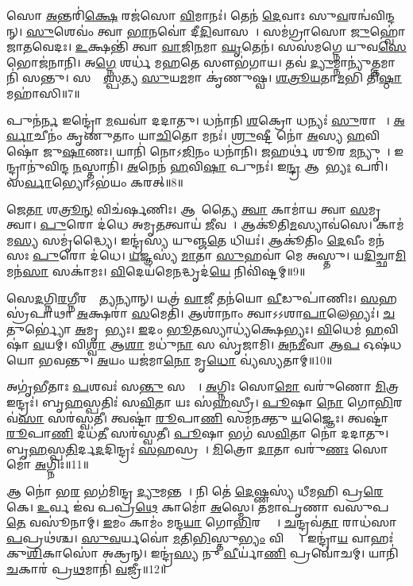 𑌸𑍋 \ul{𑌅}𑌨𑍍𑌤𑌰𑌿॑\ul{𑌕𑍍𑌷𑍇} 𑌰𑌜॑𑌸𑍋 \ul{𑌵𑌿}𑌮𑌾𑌨𑌃॑।
𑌤𑍇𑌨॑ \ul{𑌦𑍇}𑌵𑌾𑌃 𑌸𑍁\ul{𑌵}𑌰𑌨𑍍𑌵॑𑌵𑌿𑌨𑍍𑌦𑌨𑍍।
\ul{𑌸𑍁}𑌶𑍇𑌵𑌂॑ 𑌤𑍍𑌵𑌾 \ul{𑌭𑌾}𑌨𑌵𑍋॑ 𑌦𑍀\ul{𑌦𑌿}𑌵𑌾𑌸𑌮𑍍᳚।
𑌸𑌮॑𑌗𑍍𑌰𑌾𑌸𑍋 \ul{𑌜𑍁}𑌹𑍍𑌵𑍋॑ 𑌜𑌾𑌤𑌵𑍇𑌦𑌃।
\ul{𑌉}𑌕𑍍𑌷𑌨𑍍𑌤𑌿॑ 𑌤𑍍𑌵𑌾 \ul{𑌵𑌾}𑌜𑌿\ul{𑌨}𑌮𑌾 \ul{𑌘𑍃}𑌤𑍇𑌨॑।
𑌸𑌸॑𑌮𑌗𑍍𑌨𑍇 𑌯𑍁𑌵\ul{𑌸𑍇} 𑌭𑍋𑌜॑𑌨𑌾𑌨𑌿।
𑌅\ul{𑌗𑍍𑌨𑍇} 𑌶𑌰𑍍𑌧॑ 𑌮\ul{𑌹}𑌤𑍇 𑌸𑍗𑌭॑𑌗𑌾𑌯।
𑌤𑌵॑ \ul{𑌦𑍍𑌯𑍁}𑌮𑍍𑌨𑌾𑌨𑍍𑌯𑍁॑\ul{𑌤𑍍𑌤}𑌮𑌾𑌨𑌿॑ 𑌸𑌨𑍍𑌤𑍁।
𑌸𑌞𑍍𑌜𑌾᳚\ul{𑌸𑍍𑌪}𑌤𑍍𑌯 \ul{𑌸𑍁}𑌯\ul{𑌮}𑌮𑌾 𑌕𑍃॑𑌣𑍁𑌷𑍍𑌵।
\ul{𑌶}\ul{𑌤𑍍𑌰𑍂}\ul{𑌯}𑌤𑌾\ul{𑌮}𑌭𑌿 𑌤𑌿॑\ul{𑌷𑍍𑌠𑌾} 𑌮𑌹𑌾॑𑌸𑌿॥7॥\anuvakamend[\ul{𑌅}\ul{𑌸𑍍𑌤𑍍𑌵𑍇}\ul{𑌤𑍁} 𑌰𑍋𑌹𑌿॑\ul{𑌤𑍋} 𑌨𑌾\ul{𑌕𑍋} 𑌮𑌹𑌾\dng{ꣳ}॑𑌸𑌿]

𑌪𑍁𑌨॑\ul{𑌰𑍍𑌨} 𑌇𑌨𑍍𑌦𑍍𑌰𑍋॑ \ul{𑌮}𑌘𑌵𑌾॑ 𑌦𑌦𑌾𑌤𑍁।
𑌧𑌨𑌾॑𑌨𑌿 \ul{𑌶}𑌕𑍍𑌰𑍋 𑌧𑌨𑍍𑌯𑌃॑ \ul{𑌸𑍁}𑌰𑌾𑌧𑌾𑌃᳚।
\ul{𑌅}\ul{𑌰𑍍𑌵𑌾}𑌚𑍀𑌨𑌂॑ 𑌕𑍃𑌣𑍁𑌤𑌾𑌂 𑌯𑌾\ul{𑌚𑌿}𑌤𑍋 𑌮𑌨𑌃॑।
\ul{𑌶𑍍𑌰𑍁}𑌷𑍍𑌟𑍀 𑌨𑍋॑ \ul{𑌅}𑌸𑍍𑌯 \ul{𑌹}𑌵𑌿𑌷𑍋॑ 𑌜𑍁\ul{𑌷𑌾}𑌣𑌃।
𑌯𑌾𑌨𑌿॑ 𑌨𑍋𑌽\ul{𑌜𑌿}𑌨𑌂 𑌧𑌨𑌾॑𑌨𑌿।
\ul{𑌜}𑌹𑌰𑍍𑌥॑ 𑌶𑍂𑌰 \ul{𑌮}𑌨𑍍𑌯𑍁𑌨𑌾᳚।
𑌇𑌨𑍍𑌦𑍍𑌰𑌾𑌨𑍁॑𑌵𑌿𑌨𑍍𑌦 \ul{𑌨}𑌸𑍍𑌤𑌾𑌨𑌿॑।
\ul{𑌅}𑌨𑍇𑌨॑ \ul{𑌹}𑌵𑌿\ul{𑌷𑌾} 𑌪𑍁𑌨𑌃॑।
𑌇\ul{𑌨𑍍𑌦𑍍𑌰} 𑌆𑌶𑌾᳚\ul{𑌭𑍍𑌯𑌃} 𑌪𑌰𑌿॑।
𑌸\ul{𑌰𑍍𑌵𑌾}𑌭𑍍𑌯𑍋\-𑌽𑌭॑𑌯𑌂 𑌕𑌰𑌤𑍍॥8॥

𑌜𑍇\ul{𑌤𑌾} 𑌶\ul{𑌤𑍍𑌰𑍂}\ul{𑌨𑍍} 𑌵𑌿𑌚॑𑌰𑍍\mbox{}𑌷𑌣𑌿𑌃।
𑌆𑌕𑍂᳚𑌤𑍍𑌯𑍈 \ul{𑌤𑍍𑌵𑌾} 𑌕𑌾𑌮𑌾॑𑌯 𑌤𑍍𑌵𑌾 \ul{𑌸}𑌮𑍃𑌧𑍇᳚ 𑌤𑍍𑌵𑌾।
\ul{𑌪𑍁}𑌰𑍋 𑌦॑𑌧𑍇 𑌅𑌮𑍃\ul{𑌤}𑌤𑍍𑌵𑌾𑌯॑ \ul{𑌜𑍀}𑌵𑌸𑍇᳚।
𑌆𑌕𑍂॑𑌤𑌿\ul{𑌮}𑌸𑍍𑌯𑌾𑌵॑𑌸𑍇।
𑌕𑌾𑌮॑𑌮\ul{𑌸𑍍𑌯} 𑌸𑌮𑍃॑𑌦𑍍𑌧𑍍𑌯𑍈।
𑌇𑌨𑍍𑌦𑍍𑌰॑𑌸𑍍𑌯 𑌯𑍁𑌞𑍍𑌜\ul{𑌤𑍇} 𑌧𑌿𑌯𑌃॑।
𑌆𑌕𑍂॑𑌤𑌿𑌂 \ul{𑌦𑍇}𑌵𑍀𑌂 𑌮𑌨॑𑌸𑌃 \ul{𑌪𑍁}𑌰𑍋 𑌦॑𑌧𑍇।
\ul{𑌯}𑌜𑍍𑌞𑌸𑍍𑌯॑ \ul{𑌮𑌾}𑌤𑌾 \ul{𑌸𑍁}𑌹𑌵𑌾॑ 𑌮𑍇 𑌅𑌸𑍍𑌤𑍁।
𑌯\ul{𑌦𑌿}𑌚𑍍𑌛𑌾\ul{𑌮𑌿} 𑌮𑌨॑\ul{𑌸𑌾} 𑌸𑌕𑌾॑𑌮𑌃।
\ul{𑌵𑌿}𑌦𑍇𑌯॑𑌮𑍇\ul{𑌨}𑌦𑍍𑌧𑍃𑌦॑\ul{𑌯𑍇} 𑌨𑌿𑌵𑌿॑𑌷𑍍𑌟𑌮𑍍॥9॥

𑌸𑍇\ul{𑌦}𑌗𑍍𑌨𑌿\ul{𑌰}𑌗𑍍𑌨𑍀𑌰𑌤𑍍𑌯𑍇᳚\ul{𑌤𑍍𑌯}𑌨𑍍𑌯𑌾𑌨𑍍।
𑌯𑌤𑍍𑌰॑ \ul{𑌵𑌾}𑌜𑍀 𑌤𑌨॑𑌯𑍋 \ul{𑌵𑍀}𑌡𑍁𑌪𑌾॑𑌣𑌿𑌃।
\ul{𑌸}𑌹𑌸𑍍𑌰॑𑌪𑌾𑌥𑌾 \ul{𑌅}𑌕𑍍𑌷𑌰𑌾॑ \ul{𑌸}𑌮𑍇𑌤𑌿॑।
𑌆𑌶𑌾॑𑌨𑌾𑌂 𑌤𑍍𑌵𑌾\-𑌽𑌽𑌶𑌾\ul{𑌪𑌾}𑌲𑍇𑌭𑍍𑌯𑌃॑।
\ul{𑌚}𑌤𑍁𑌰𑍍𑌭𑍍𑌯𑍋॑ \ul{𑌅}𑌮𑍃𑌤𑍇᳚𑌭𑍍𑌯𑌃।
\ul{𑌇}𑌦𑌂 \ul{𑌭𑍂}𑌤𑌸𑍍𑌯𑌾𑌧𑍍𑌯॑𑌕𑍍𑌷𑍇𑌭𑍍𑌯𑌃।
\ul{𑌵𑌿}𑌧𑍇𑌮॑ \ul{𑌹}𑌵𑌿𑌷𑌾॑ \ul{𑌵}𑌯𑌮𑍍।
𑌵𑌿\ul{𑌶𑍍𑌵𑌾} 𑌆\ul{𑌶𑌾} 𑌮𑌧𑍁॑\ul{𑌨𑌾} 𑌸 𑌸𑍃॑𑌜𑌾𑌮𑌿।
\ul{𑌅}\ul{𑌨}\ul{𑌮𑍀}𑌵𑌾 𑌆\ul{𑌪} 𑌓𑌷॑𑌧𑌯𑍋 𑌭𑌵𑌨𑍍𑌤𑍁।
\ul{𑌅}𑌯𑌂 𑌯𑌜॑𑌮𑌾\ul{𑌨𑍋} 𑌮𑍃\ul{𑌧𑍋} 𑌵𑍍𑌯॑𑌸𑍍𑌯𑌤𑌾𑌮𑍍॥10॥

𑌅𑌗𑍃॑𑌭𑍀𑌤𑌾𑌃 \ul{𑌪}𑌶𑌵𑌃॑ 𑌸\ul{𑌨𑍍𑌤𑍁} 𑌸𑌰𑍍𑌵𑍇᳚।
\ul{𑌅}𑌗𑍍𑌨𑌿𑌃 𑌸𑍋\ul{𑌮𑍋} 𑌵𑌰𑍁॑𑌣𑍋 \ul{𑌮𑌿}𑌤𑍍𑌰 𑌇𑌨𑍍𑌦𑍍𑌰𑌃॑।
𑌬𑍃\ul{𑌹}𑌸𑍍𑌪𑌤𑌿𑌃॑ 𑌸\ul{𑌵𑌿}𑌤𑌾 𑌯𑌃 𑌸॑\ul{𑌹}𑌸𑍍𑌰𑍀।
\ul{𑌪𑍂}𑌷𑌾 \ul{𑌨𑍋} 𑌗𑍋\ul{𑌭𑌿}𑌰𑌵॑\ul{𑌸𑌾} 𑌸𑌰॑𑌸𑍍𑌵𑌤𑍀।
𑌤𑍍𑌵𑌷𑍍𑌟𑌾॑ \ul{𑌰𑍂}𑌪𑌾\ul{𑌣𑌿} 𑌸𑌮॑𑌨𑌕𑍍𑌤𑍁 \ul{𑌯}𑌜𑍍𑌞𑍈𑌃।
𑌤𑍍𑌵𑌷𑍍𑌟𑌾॑ \ul{𑌰𑍂}𑌪𑌾\ul{𑌣𑌿} 𑌦𑌧॑\ul{𑌤𑍀} 𑌸𑌰॑𑌸𑍍𑌵𑌤𑍀।
\ul{𑌪𑍂}𑌷𑌾 𑌭𑌗॑ 𑌸\ul{𑌵𑌿}𑌤𑌾 𑌨𑍋॑ 𑌦𑌦𑌾𑌤𑍁।
𑌬𑍃\ul{𑌹}𑌸𑍍𑌪\ul{𑌤𑌿}𑌰𑍍𑌦\ul{𑌦}𑌦𑌿𑌨𑍍𑌦𑍍𑌰𑌃॑ \ul{𑌸}𑌹𑌸𑍍𑌰𑌮𑍍᳚।
\ul{𑌮𑌿}𑌤𑍍𑌰𑍋 \ul{𑌦𑌾}𑌤𑌾 𑌵𑌰𑍁॑\ul{𑌣𑌃} 𑌸𑍋𑌮𑍋॑ \ul{𑌅}𑌗𑍍𑌨𑌿𑌃॥11॥\anuvakamend[\ul{𑌕}\ul{𑌰}𑌨𑍍𑌨𑌿𑌵𑌿॑𑌷𑍍𑌟𑌮𑌸𑍍𑌯\ul{𑌤𑌾}𑌨𑍍𑌨𑌵॑ 𑌚]

𑌆 𑌨𑍋॑ 𑌭\ul{𑌰} 𑌭𑌗॑𑌮𑌿𑌨𑍍𑌦𑍍𑌰 \ul{𑌦𑍍𑌯𑍁}𑌮𑌨𑍍𑌤𑌮𑍍᳚।
𑌨𑌿 𑌤𑍇॑ \ul{𑌦𑍇}𑌷𑍍𑌣𑌸𑍍𑌯॑ 𑌧𑍀𑌮𑌹𑌿 𑌪𑍍𑌰\ul{𑌰𑍇}𑌕𑍇।
\ul{𑌉}𑌰𑍍𑌵 𑌇॑𑌵 𑌪𑌪𑍍𑌰\ul{𑌥𑍇} 𑌕𑌾𑌮𑍋॑ \ul{𑌅}𑌸𑍍𑌮𑍇।
𑌤𑌮𑌾𑌪𑍃॑𑌣𑌾 𑌵𑌸𑍁𑌪\ul{𑌤𑍇} 𑌵𑌸𑍂॑𑌨𑌾𑌮𑍍।
\ul{𑌇}𑌮𑌂 𑌕𑌾𑌮𑌂॑ 𑌮𑌨𑍍𑌦\ul{𑌯𑌾} 𑌗𑍋\ul{𑌭𑌿}𑌰𑌶𑍍𑌵𑍈𑌃᳚।
\ul{𑌚}𑌨𑍍𑌦𑍍𑌰𑌵॑\ul{𑌤𑌾} 𑌰𑌾𑌧॑𑌸𑌾 \ul{𑌪}𑌪𑍍𑌰𑌥॑𑌶𑍍𑌚।
\ul{𑌸𑍁}\ul{𑌵}𑌰𑍍𑌯𑌵𑍋॑ \ul{𑌮}𑌤𑌿\ul{𑌭𑌿}𑌸𑍍𑌤𑍁\ul{𑌭𑍍𑌯𑌂} 𑌵𑌿𑌪𑍍𑌰𑌾𑌃᳚।
𑌇𑌨𑍍𑌦𑍍𑌰𑌾॑\ul{𑌯} 𑌵𑌾𑌹𑌃॑ 𑌕𑍁\ul{𑌶𑌿}𑌕𑌾𑌸𑍋॑ 𑌅𑌕𑍍𑌰𑌨𑍍।
𑌇𑌨𑍍𑌦𑍍𑌰॑\ul{𑌸𑍍𑌯} 𑌨𑍁 \ul{𑌵𑍀}𑌰𑍍𑌯𑌾॑\ul{𑌣𑌿} 𑌪𑍍𑌰𑌵𑍋॑𑌚𑌮𑍍।
𑌯𑌾𑌨𑌿॑ \ul{𑌚}𑌕𑌾𑌰॑ 𑌪𑍍𑌰\ul{𑌥}𑌮𑌾𑌨𑌿॑ \ul{𑌵}𑌜𑍍𑌰𑍀॥12॥

